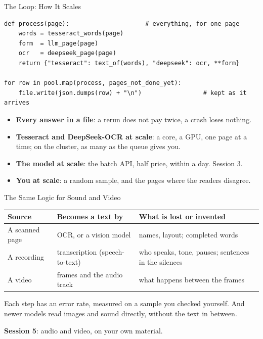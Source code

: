 \documentclass[svgnames,x11names,dvipsnames]{beamer}
\newcommand{\chg}[1]{{\bfseries #1}}
\renewcommand{\chg}[1]{#1}
\newcommand{\new}[1]{#1}
\begin{document}
\begin{frame}[fragile]{\new{The Loop: How It Scales}}
\vspace{0.1cm}
{\scriptsize
\begin{verbatim}
def process(page):                     # everything, for one page
    words = tesseract_words(page)
    form  = llm_page(page)
    ocr   = deepseek_page(page)
    return {"tesseract": text_of(words), "deepseek": ocr, **form}

for row in pool.map(process, pages_not_done_yet):
    file.write(json.dumps(row) + "\n")                 # kept as it arrives
\end{verbatim}}

\vspace{0.3cm}
\small
\begin{itemize}
    \setlength{\itemsep}{4pt}
    \item \textbf{Every answer in a file}: a rerun does not pay twice, a crash loses nothing.
    \item \textbf{Tesseract and DeepSeek-OCR at scale}: a core, a GPU, one page at a time; on the cluster, as many as the queue gives you.
    \item \textbf{The model at scale}: the batch API, half price, within a day. Session 3.
    \item \textbf{You at scale}: a random sample, and the pages where the readers disagree.
\end{itemize}
\end{frame}

\begin{frame}{\chg{The Same Logic for Sound and Video}}
\footnotesize
\renewcommand{\arraystretch}{1.6}
\begin{tabular}{@{}>{\raggedright\arraybackslash}p{2.2cm}>{\raggedright\arraybackslash}p{3.1cm}>{\raggedright\arraybackslash}p{4.9cm}@{}}
\toprule
\textbf{Source} & \textbf{Becomes a text by} & \textbf{What is lost or invented} \\
\midrule
A scanned page & OCR, or a vision model & names, layout; completed words \\
A recording & transcription (speech-to-text) & who speaks, tone, pauses; sentences in the silences \\
A video & frames and the audio track & what happens between the frames \\
\bottomrule
\end{tabular}

\vspace{0.5cm}
\small
Each step has an error rate, measured on a sample you checked yourself. And newer models read images and sound directly, without the text in between.

\vspace{0.3cm}
\textbf{Session 5}: audio and video, on your own material.
\end{frame}
\end{document}

